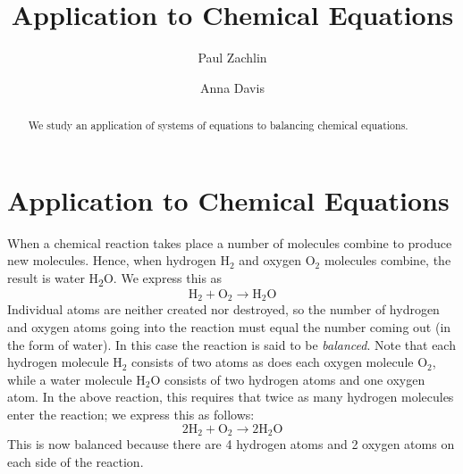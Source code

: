 \documentclass{ximera}
\author{Paul Zachlin \and Anna Davis} \title{Application to Chemical Equations} \license{CC-BY 4.0}
\begin{document}
\begin{abstract}
 We study an application of systems of equations to balancing chemical equations.
\end{abstract}
\maketitle

\section*{Application to Chemical Equations}
When a chemical reaction takes place a number of molecules combine to produce new molecules. Hence, when hydrogen $\mbox{H}_2$ and oxygen $\mbox{O}_2$ molecules combine, the result is water H\textsubscript{2}O. We express this as
\begin{equation*}
\mbox{H}_2 + \mbox{O}_2 \rightarrow \mbox{H}_2\mbox{O}
\end{equation*}
Individual atoms are neither created nor destroyed, so the number of hydrogen and oxygen atoms going into the reaction must equal the number coming out (in the form of water). In
this case the reaction is said to be \textit{balanced}. Note that each hydrogen molecule $\mbox{H}_2$ consists of two atoms as does each oxygen molecule $\mbox{O}_2$, while a water molecule $\mbox{H}_2\mbox{O}$ consists of two hydrogen atoms and one oxygen atom. In the above reaction, this requires that twice as many hydrogen molecules enter the reaction; we express this as follows:
\begin{equation*}
2\mbox{H}_2 + \mbox{O}_2 \rightarrow 2\mbox{H}_2\mbox{O}
\end{equation*}
This is now balanced because there are 4 hydrogen atoms and 2 oxygen atoms on each side of the reaction.
\end{document}
